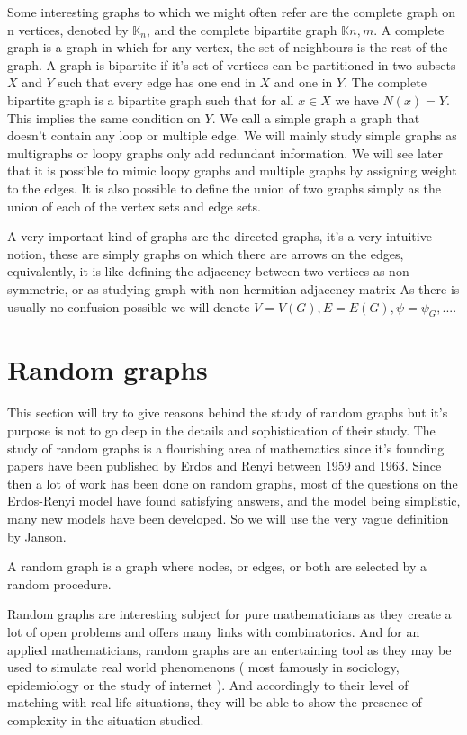 Some interesting graphs to which we might often refer are the complete graph on n vertices, denoted by $\mathbb{K}_n$, and the complete bipartite graph $\mathbb{K}{n,m}$. A complete graph is a graph in which for any vertex, the set of neighbours is the rest of the graph. 
A graph is bipartite if it's set of vertices can be partitioned in two subsets $X$ and $Y$ such that every edge has one end in $X$ and one in $Y$. 
The complete bipartite graph is a bipartite graph such that for all $x \in X$ we have $N(x) = Y$. 
This implies the same condition on $Y$.
\newline
We call a simple graph a graph that doesn't contain any loop or multiple edge. We will mainly study simple graphs as multigraphs or loopy graphs only add redundant information. We will see later that it is possible to mimic loopy graphs and multiple graphs by assigning weight to the edges.
\newline
It is also possible to define the union of two graphs simply as the union of each of the vertex sets and edge sets.

\newline
A very important kind of graphs are the directed graphs, it's a very intuitive notion, these are simply graphs on which there are arrows on the edges, equivalently, it is like defining the adjacency between two vertices as non  symmetric, or as studying graph with non hermitian adjacency matrix 
\newline
As there is usually no confusion possible we will denote $V = V(G), E =E(G), \psi = \psi_G, ...$. 


\section{Random graphs}
This section will try to give reasons behind the study of random graphs but it's purpose is not to go deep in the details and sophistication of their study.
The study of random graphs is a flourishing area of mathematics since it's founding papers have been published by Erdos and Renyi between 1959 and 1963. Since then a lot of work has been done on random graphs, most of the questions on the Erdos-Renyi model have found satisfying answers, and the model being simplistic, many new models have been developed.
So we will use the very vague definition by Janson.
\begin{definition} A random graph is a graph where nodes, or edges, or both are selected by a random procedure.
\end{definition}
Random graphs are interesting subject for pure mathematicians as they create a lot of open problems and offers many links with combinatorics. And for an applied mathematicians, random graphs are an entertaining tool as they may be used to simulate real world phenomenons ( most famously in sociology, epidemiology or the study of internet ). And accordingly to their level of matching with real life situations, they will be able to show the presence of complexity in the situation studied.
